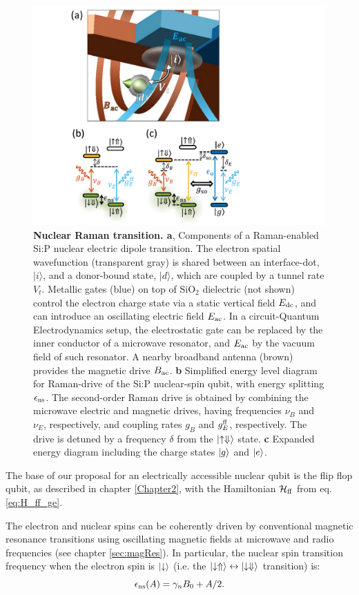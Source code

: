 \begin{figure}
\centering
\includegraphics[width=0.8\columnwidth]{fig1_Raman_v5}
\caption[Nuclear Raman transition]{\textbf{Nuclear Raman transition. a}, Components of a Raman-enabled Si:P nuclear electric dipole transition. The electron  spatial wavefunction (transparent gray) is shared between an interface-dot, $|i\rangle$, and a donor-bound state, $|d\rangle$, which are coupled by a tunnel rate $V_t$. Metallic gates (blue) on top of SiO$_2$ dielectric (not shown) control the electron charge state via a static vertical field $E_{\rm dc}$, and can introduce an oscillating electric field $E_{\rm ac}$. In a circuit-Quantum Electrodynamics setup, the electrostatic gate can be replaced by the inner conductor of a microwave resonator, and $E_{\rm ac}$ by the vacuum field of such resonator. A nearby broadband antenna \cite{Dehollain2014} (brown) provides the magnetic drive $B_{\rm ac}$. 
\textbf{b} Simplified energy level diagram for Raman-drive of the Si:P nuclear-spin qubit, with energy splitting $\epsilon_{\rm ns}$. The second-order Raman drive is obtained by combining the microwave electric and magnetic drives, having frequencies $\nu_B$ and $\nu_E$, respectively, and coupling rates $g_B$ and $g_E^{\rm ff}$, respectively. The drive is detuned by a frequency $\delta$ from the $\ket{\uparrow \Downarrow}$ state. 
\textbf{c} Expanded energy diagram including the charge states $\ket{g}$ and $\ket{e}$.
}
\label{fig:Raman}
\end{figure}


The base of our proposal for an electrically accessible nuclear qubit is the flip flop qubit, as described in chapter \ref{Chapter2}, with the Hamiltonian $\mathcal{H}_{\rm ff}$ from eq. \eqref{eq:H_ff_ge}. 

The electron and nuclear spins can be coherently driven by conventional magnetic resonance transitions using oscillating magnetic fields at microwave \cite{Pla2012} and radio frequencies \cite{Pla2013} (see chapter \ref{sec:magRes}). In particular, the nuclear spin transition frequency when the electron spin is $\ket{\downarrow}$ (i.e. the $\ket{\downarrow \Uparrow} \leftrightarrow \ket{\downarrow \Downarrow}$ transition) is:
\begin{equation} \label{eq:epsilon_ns}
\epsilon_{\rm ns}(A) = \gamma_nB_0 + A/2.
\end{equation}


